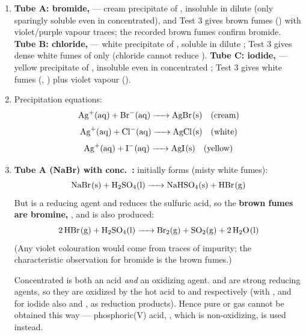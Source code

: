 \documentclass[11pt]{article}
\begin{document}
\begin{corrige}
\begin{enumerate}
\item \textbf{Tube A: bromide, } — cream precipitate of , insoluble in dilute  (only sparingly soluble even in concentrated), and Test 3 gives brown fumes () with violet/purple vapour traces; the recorded brown fumes confirm bromide. \textbf{Tube B: chloride, } — white precipitate of , soluble in dilute ; Test 3 gives dense white fumes of  only (chloride cannot reduce ). \textbf{Tube C: iodide, } — yellow precipitate of , insoluble even in concentrated ; Test 3 gives white fumes (, ) plus violet vapour ().

\item Precipitation equations:
\[
\ce{Ag^{+}(aq) + Br^{-}(aq) -> AgBr(s)} \quad \text{(cream)}
\]
\[
\ce{Ag^{+}(aq) + Cl^{-}(aq) -> AgCl(s)} \quad \text{(white)}
\]
\[
\ce{Ag^{+}(aq) + I^{-}(aq) -> AgI(s)} \quad \text{(yellow)}
\]

\item \textbf{Tube A (NaBr) with conc.\ :} initially  forms (misty white fumes):
\[
\ce{NaBr(s) + H2SO4(l) -> NaHSO4(s) + HBr(g)}
\]
But  is a reducing agent and reduces the sulfuric acid, so the \textbf{brown fumes are bromine, }, and  is also produced:
\[
\ce{2HBr(g) + H2SO4(l) -> Br2(g) + SO2(g) + 2H2O(l)}
\]
(Any violet colouration would come from traces of  impurity; the characteristic observation for bromide is the brown  fumes.)

Concentrated  is both an acid \emph{and} an oxidizing agent.  and  are strong reducing agents, so they are oxidized by the hot acid to  and  respectively (with , and for iodide also  and , as reduction products). Hence pure  or  gas cannot be obtained this way — phosphoric(V) acid, , which is non-oxidizing, is used instead.
\end{enumerate}
\end{corrige}
\end{document}
